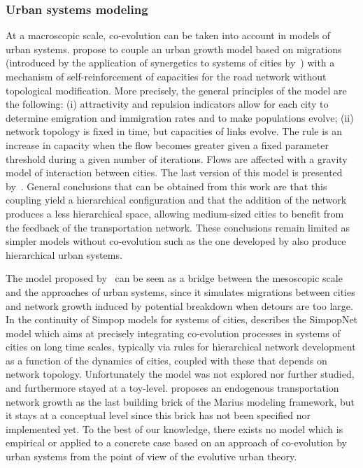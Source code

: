 \documentclass[11pt]{article}
\begin{document}
\subsubsection{Urban systems modeling}

At a macroscopic scale, co-evolution can be taken into account in models of urban systems. \cite{baptiste1999interactions} propose to couple an urban growth model based on migrations (introduced by the application of synergetics to systems of cities by~\citep{sanders1992systeme}) with a mechanism of self-reinforcement of capacities for the road network without topological modification. More precisely, the general principles of the model are the following: (i) attractivity and repulsion indicators allow for each city to determine emigration and immigration rates and to make populations evolve; (ii) network topology is fixed in time, but capacities of links evolve. The rule is an increase in capacity when the flow becomes greater given a fixed parameter threshold during a given number of iterations. Flows are affected with a gravity model of interaction between cities. The last version of this model is presented by~\cite{baptistemodeling}. General conclusions that can be obtained from this work are that this coupling yield a hierarchical configuration and that the addition of the network produces a less hierarchical space, allowing medium-sized cities to benefit from the feedback of the transportation network. These conclusions remain limited as simpler models without co-evolution such as the one developed by \cite{raimbault2018indirect} also produce hierarchical urban systems.


The model proposed by~\cite{blumenfeld2010network} can be seen as a bridge between the mesoscopic scale and the approaches of urban systems, since it simulates migrations between cities and network growth induced by potential breakdown when detours are too large. In the continuity of Simpop models for systems of cities, \cite{schmitt2014modelisation} describes the SimpopNet model which aims at precisely integrating co-evolution processes in systems of cities on long time scales, typically via rules for hierarchical network development as a function of the dynamics of cities, coupled with these that depends on network topology. Unfortunately the model was not explored nor further studied, and furthermore stayed at a toy-level. \cite{cottineau2014evolution} proposes an endogenous transportation network growth as the last building brick of the Marius modeling framework, but it stays at a conceptual level since this brick has not been specified nor implemented yet. To the best of our knowledge, there exists no model which is empirical or applied to a concrete case based on an approach of co-evolution by urban systems from the point of view of the evolutive urban theory.
\end{document}
